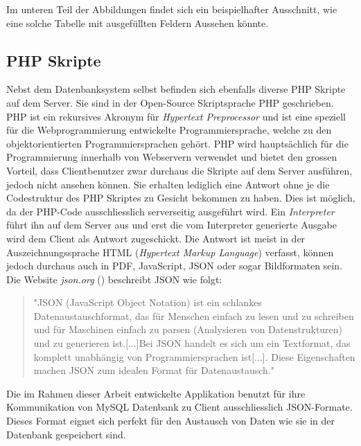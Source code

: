 \documentclass[a4paper,11pt]{report}
\begin{document}
				Im unteren Teil der Abbildungen findet sich ein beispielhafter Ausschnitt, wie eine solche Tabelle mit ausgefüllten Feldern Aussehen könnte.
				\subsection{PHP Skripte} \label{ssec:PHP}
				Nebst dem Datenbanksystem selbst befinden sich ebenfalls diverse PHP Skripte auf dem Server. Sie sind in der Open-Source Skriptsprache PHP geschrieben. PHP ist ein rekursives Akronym für \emph{Hypertext Preprocessor} und ist eine speziell für die Webprogrammierung entwickelte Programmiersprache, welche zu den objektorientierten Programmiersprachen gehört. PHP wird hauptsächlich für die Programmierung innerhalb von Webservern verwendet und bietet den grossen Vorteil, dass Clientbenutzer zwar durchaus die Skripte auf dem Server ausführen, jedoch nicht ansehen können. Sie erhalten lediglich eine Antwort ohne je die Codestruktur des PHP Skriptes zu Gesicht bekommen zu haben.\cite{PHP} Dies ist möglich, da der PHP-Code ausschliesslich serverseitig ausgeführt wird. Ein \emph{Interpreter} führt ihn auf dem Server aus und erst die vom Interpreter generierte Ausgabe wird dem Client als Antwort zugeschickt. Die Antwort ist meist in der Auszeichnungssprache HTML (\emph{Hypertext Markup Language}) verfasst, können jedoch durchaus auch in PDF, JavaScript, JSON oder sogar Bildformaten sein.\cite{PHP:function} Die Website \emph{json.org} (\cite{JSON}) beschreibt JSON wie folgt:
				
				\begin{quotation}
					"JSON (JavaScript Object Notation) ist ein schlankes Datenaustauschformat, das für Menschen einfach zu lesen und zu schreiben und für Maschinen einfach zu parsen (Analysieren von Datenstrukturen) und zu generieren ist.[...]Bei JSON handelt es sich um ein Textformat, das komplett unabhängig von Programmiersprachen ist[...]. Diese Eigenschaften machen JSON zum idealen Format für Datenaustausch."\cite{JSON}
				\end{quotation}
			
				Die im Rahmen dieser Arbeit entwickelte Applikation benutzt für ihre Kommunikation von MySQL Datenbank zu Client ausschliesslich JSON-Formate. Dieses Format eignet sich perfekt für den Austausch von Daten wie sie in der Datenbank gespeichert sind.
				
\end{document}
